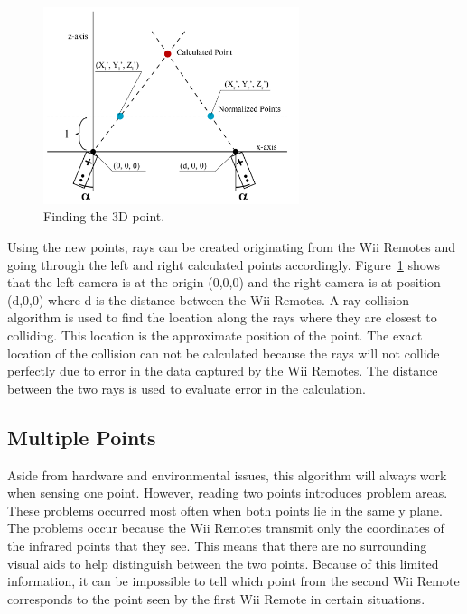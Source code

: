\documentclass[a4paper,twoside]{article}
\begin{document}
\begin{figure}[h] \includegraphics[width = 7.5cm]{Diagram4_FinalPoint.png}
\caption{Finding the 3D point.} \label{finalpoint} \end{figure}

Using the new points, rays can be created originating from the Wii Remotes and
going through the left and right calculated points accordingly.
Figure~\ref{finalpoint} shows that the left camera is at the origin (0,0,0) and
the right camera is at position (d,0,0) where d is the distance between the Wii
Remotes. A ray collision algorithm is used to find the location along the rays
where they are closest to colliding. This location is the approximate position
of the point. The exact location of the collision can not be calculated because
the rays will not collide perfectly due to error in the data captured by the
Wii Remotes. The distance between the two rays is used to evaluate error in the
calculation.

\subsection{Multiple Points}Aside from hardware and environmental issues, this
algorithm will always work when sensing one point. However, reading two points
introduces problem areas. These problems occurred most often when both points
lie in the same y plane. The problems occur because the Wii Remotes transmit
only the coordinates of the infrared points that they see. This means that
there are no surrounding visual aids to help distinguish between the two
points. Because of this limited information, it can be impossible to tell which
point from the second Wii Remote corresponds to the point seen by the first Wii
Remote in certain situations.  
 
\end{document}
